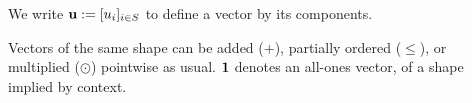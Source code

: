 \documentclass{article}
\newcommand\discard[1]{}
\begin{document}
We write $\mathbf{u} := [u_i]_{i \in S}$ to define a vector by its components.
\discard{\color{gray!30!white}
    We will sometimes use superscripts as well, especially when indices depend on one another. For example, if $\dg S$ is a finite set of finite sets, then
    $[u^S_s]^{S \in \dg S}_{s \in S}$ denotes a vector which has an element
    for each pair $(S,s)$, satisfying $s \in S \in \dg S$.
    By supplying just the upper index of such a vector, as in $\mat u^{S_0}$,
    we mean $[u^{S_0}_s]_{s \in {S_0}}$, the projection of $\mat u$ onto the subspace whose upper index is $S_0$.
}
Vectors of the same shape
can be added (+), partially ordered ($\le$), or multiplied ($\odot$) pointwise as usual.
$\mathbf{1}$ denotes an all-ones vector, of a shape implied by context.
\end{document}
